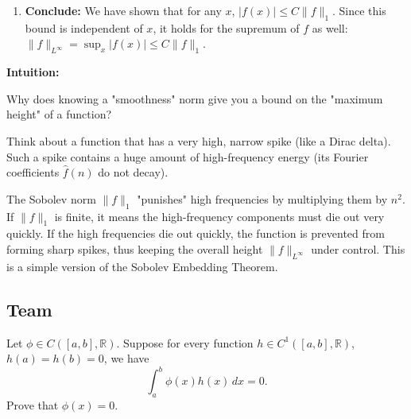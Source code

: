 \begin{solution}
\begin{enumerate}
    \item \textbf{Conclude:}
    We have shown that for any $x$, $|f(x)| \leq C \|f\|_1$. 
    Since this bound is independent of $x$, it holds for the supremum of $f$ as well: 
    $\|f\|_{L^\infty} = \sup_{x} |f(x)| \leq C \|f\|_1$.
\end{enumerate}
\par\medskip
\textbf{Intuition:}
\par\medskip
Why does knowing a "smoothness" norm give you a bound on the "maximum height" of a function? 
\par\medskip
Think about a function that has a very high, narrow spike (like a Dirac delta). Such a spike contains a huge amount of high-frequency energy (its Fourier coefficients $\hat{f}(n)$ do not decay). 
\par\medskip
The Sobolev norm $\|f\|_1$ "punishes" high frequencies by multiplying them by $n^2$. If $\|f\|_1$ is finite, it means the high-frequency components must die out very quickly. If the high frequencies die out quickly, the function is prevented from forming sharp spikes, thus keeping the overall height $\|f\|_{L^\infty}$ under control. This is a simple version of the Sobolev Embedding Theorem.
\end{solution}


\subsection{Team}

\begin{exercise}
\label{analysis:2015:7}
Let $\phi\in C([a,b],\mathbb{R})$. Suppose for every function $h\in C^1([a,b],\mathbb{R})$, $h(a)=h(b)=0$, we have
\[
\int_a^b \phi(x)h(x)\,dx = 0.
\]
Prove that $\phi(x)=0$.
\end{exercise}

